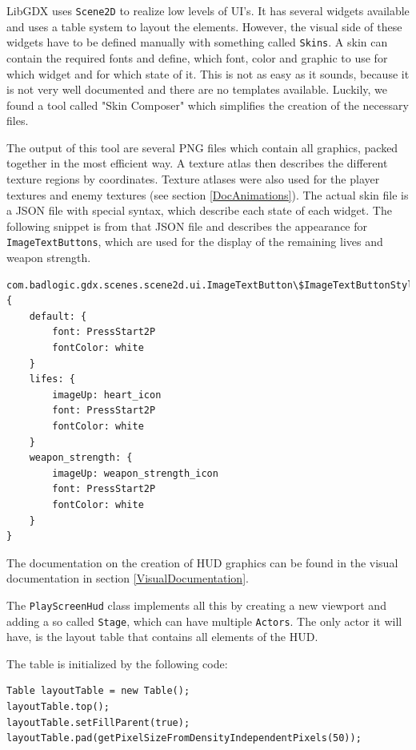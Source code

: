 \documentclass[12p]{article}
\begin{document}
LibGDX uses \texttt{Scene2D} \cite{Scene2DUI} to realize low levels of UI's. It has several widgets available and uses a table system to layout the elements. However, the visual side of these widgets have to be defined manually with something called \texttt{Skins}. A skin can contain the required fonts and define, which font, color and graphic to use for which widget and for which state of it. This is not as easy as it sounds, because it is not very well documented and there are no templates available. Luckily, we found a tool called "Skin Composer" \cite{SkinComposer} which simplifies the creation of the necessary files.

The output of this tool are several PNG files which contain all graphics, packed together in the most efficient way. A texture atlas then describes the different texture regions by coordinates. Texture atlases were also used for the player textures and enemy textures (see section \ref{DocAnimations}). The actual skin file is a JSON file with special syntax, which describe each state of each widget. The following snippet is from that JSON file and describes the appearance for \texttt{ImageTextButtons}, which are used for the display of the remaining lives and weapon strength.

\begin{verbatim}
com.badlogic.gdx.scenes.scene2d.ui.ImageTextButton\$ImageTextButtonStyle: {
	default: {
		font: PressStart2P
		fontColor: white
	}
	lifes: {
		imageUp: heart_icon
		font: PressStart2P
		fontColor: white
	}
	weapon_strength: {
		imageUp: weapon_strength_icon
		font: PressStart2P
		fontColor: white
	}
}
\end{verbatim}

The documentation on the creation of HUD graphics can be found in the visual documentation in section \ref{VisualDocumentation}.

The \texttt{PlayScreenHud} class implements all this by creating a new viewport and adding a so called \texttt{Stage}, which can have multiple \texttt{Actors}. The only actor it will have, is the layout table that contains all elements of the HUD.

The table is initialized by the following code:

\begin{verbatim}
Table layoutTable = new Table();
layoutTable.top();
layoutTable.setFillParent(true);
layoutTable.pad(getPixelSizeFromDensityIndependentPixels(50));
\end{verbatim}
\end{document}
